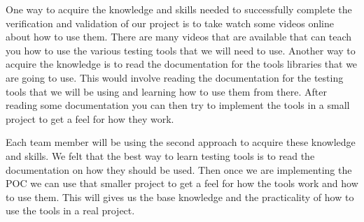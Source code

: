 \documentclass[12pt, titlepage]{article}
\begin{document}
\begin{enumerate}
  One way to acquire the knowledge and skills needed to successfully complete the verification and validation of our project is to take watch some videos online about how to use them.
  There are many videos that are available that can teach you how to use the various testing tools that we will need to use.
  Another way to acquire the knowledge is to read the documentation for the tools libraries that we are going to use.
  This would involve reading the documentation for the testing tools that we will be using and learning how to use them from there.
  After reading some documentation you can then try to implement the tools in a small project to get a feel for how they work.

  Each team member will be using the second approach to acquire these knowledge and skills. 
  We felt that the best way to learn testing tools is to read the documentation on how they should be used.
  Then once we are implementing the POC we can use that smaller project to get a feel for how the tools work and how to use them.
  This will gives us the base knowledge and the practicality of how to use the tools in a real project.
\end{enumerate}
\end{document}
